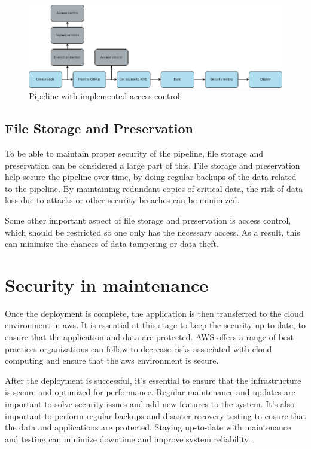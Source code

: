 \vspace{2mm}
\begin{figure}[H]
    \centering
    \includegraphics[width=0.8\columnwidth]{Images/pipeline7.png}
    \caption{Pipeline with implemented access control}
    \label{fig: Pipeline with implemented access control}
\end{figure}
 
\subsection{File Storage and Preservation}
To be able to maintain proper security of the pipeline, file storage and preservation can be considered a large part of this. File storage and preservation help secure the pipeline over time, by doing regular backups of the data related to the pipeline. By maintaining redundant copies of critical data, the risk of data loss due to attacks or other security breaches can be minimized. 

Some other important aspect of file storage and preservation is access control, which should be restricted so one only has the necessary access. As a result, this can minimize the chances of data tampering or data theft.

\section{Security in maintenance}
Once the deployment is complete, the application is then transferred to the cloud environment in \acrlong{aws}. It is essential at this stage to keep the security up to date, to ensure that the application and data are protected. AWS offers a range of best practices organizations can follow to decrease risks associated with cloud computing and ensure that the  \acrshort{aws} environment is secure.

After the deployment is successful, it's essential to ensure that the infrastructure is secure and optimized for performance. Regular maintenance and updates are important to solve security issues and add new features to the system. It's also important to perform regular backups and disaster recovery testing to ensure that the data and applications are protected. 
Staying up-to-date with maintenance and testing can minimize downtime and improve system reliability. 

